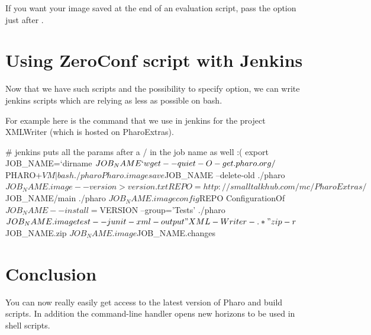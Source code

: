 \documentclass[a4paper,10pt,twoside]{book}
\begin{document}
If you want your image saved at the end of an evaluation script, pass the  option just after .

\section{Using ZeroConf script with Jenkins}
Now that we have such scripts and the possibility to specify option, we can write jenkins scripts which are relying as less as possible on bash. 

For example here is the command that we use in jenkins for the project XMLWriter (which is hosted on PharoExtras). 

\begin{code}{}
# jenkins puts all the params after a / in the job name as well :(
export JOB_NAME=`dirname $JOB_NAME`

wget --quiet -O - get.pharo.org/$PHARO+$VM | bash

./pharo Pharo.image save $JOB_NAME --delete-old
./pharo $JOB_NAME.image --version > version.txt

REPO=http://smalltalkhub.com/mc/PharoExtras/$JOB_NAME/main
./pharo $JOB_NAME.image config $REPO ConfigurationOf$JOB_NAME --install=$VERSION --group='Tests'
./pharo $JOB_NAME.image test --junit-xml-output "XML-Writer-.*"

zip -r $JOB_NAME.zip $JOB_NAME.image $JOB_NAME.changes
\end{code}

\section{Conclusion}
You can now really easily get access to the latest version of Pharo and build scripts. In addition the 
command-line handler opens new horizons to be used in shell scripts.

\ifx\wholebook\relax\else
   
   
\end{document}
